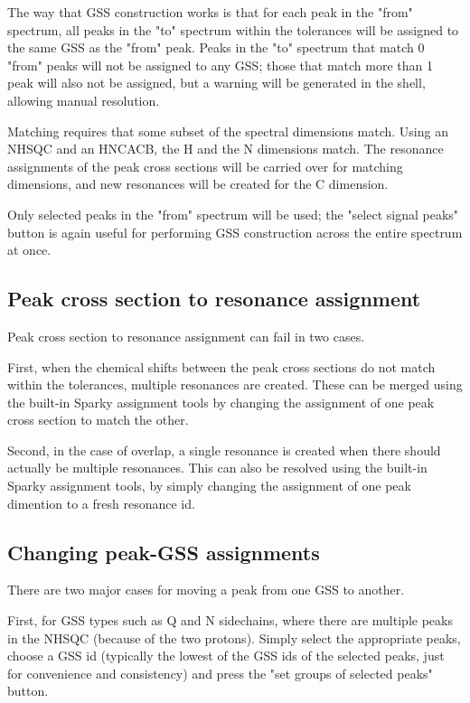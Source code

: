 The way that GSS construction works is that for each peak in the "from"
spectrum, all peaks in the "to" spectrum within the tolerances will be
assigned to the same GSS as the "from" peak.  Peaks in the "to" spectrum that
match 0 "from" peaks will not be assigned to any GSS; those that match more
than 1 peak will also not be assigned, but a warning will be generated in
the shell, allowing manual resolution.

Matching requires that some subset of the spectral dimensions match.  Using
an NHSQC and an HNCACB, the H and the N dimensions match.  The resonance
assignments of the peak cross sections will be carried over for matching dimensions,
and new resonances will be created for the C dimension.

Only selected peaks in the "from" spectrum will be used; the "select signal 
peaks" button is again useful for performing GSS construction across the
entire spectrum at once.

\subsection{Peak cross section to resonance assignment}
Peak cross section to resonance assignment can fail in two cases.

First, when the chemical shifts between the peak cross sections do not match
within the tolerances, multiple resonances are created.  These can be merged
using the built-in Sparky assignment tools by changing the assignment of one
peak cross section to match the other.

Second, in the case of overlap, a single resonance is created when there
should actually be multiple resonances.  This can also be resolved using
the built-in Sparky assignment tools, by simply changing the assignment of
one peak dimention to a fresh resonance id.

\subsection{Changing peak-GSS assignments}
There are two major cases for moving a peak from one GSS to another.

First, for GSS types such as Q and N sidechains, where there are multiple
peaks in the NHSQC (because of the two protons).  Simply select the appropriate
peaks, choose a GSS id (typically the lowest of the GSS ids of the selected
peaks, just for convenience and consistency) and press the "set groups of
selected peaks" button.

